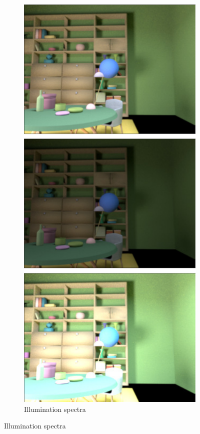 \documentclass{jov}
\begin{document}
\begin{figure}
\begin{subfigure}[b]{0.18 \textwidth}
        \label{fig:targetVariation}
    \end{subfigure}
    ~
    \begin{subfigure}[b]{0.18 \textwidth}
    \centering
        \caption{Illumination spectra}
        \includegraphics[width=\textwidth]{../FiguresDraft5/Figure4/Figure4_d.pdf}

\end{subfigure}
\end{figure}
\end{document}
